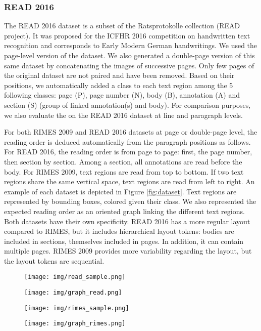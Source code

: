 \subsubsection{READ 2016}
The READ 2016 dataset is a subset of the Ratsprotokolle collection (READ project). It was proposed for the ICFHR 2016 competition on handwritten text recognition and corresponds to Early Modern German handwritings. We used the page-level version of the dataset. We also generated a double-page version of this same dataset by concatenating the images of successive pages. Only few pages of the original dataset are not paired and have been removed. Based on their positions, we automatically added a class to each text region among the 5 following classes: page (P), page number (N), body (B), annotation (A) and section (S) (group of linked annotation(s) and body). For comparison purposes, we also evaluate the \modelacc{} on the READ 2016 dataset at line and paragraph levels.


For both RIMES 2009 and READ 2016 datasets at page or double-page level, the reading order is deduced automatically from the paragraph positions as follows. 
For READ 2016, the reading order is from page to page: first, the page number, then section by section. Among a section, all annotations are read before the body.
For RIMES 2009, text regions are read from top to bottom. If two text regions share the same vertical space, text regions are read from left to right.
An example of each dataset is depicted in Figure \ref{fig:dataset}. Text regions are represented by bounding boxes, colored given their class. We also represented the expected reading order as an oriented graph linking the different text regions. Both datasets have their own specificity. READ 2016 has a more regular layout compared to RIMES, but it includes hierarchical layout tokens: bodies are included in sections, themselves included in pages. In addition, it can contain multiple pages. RIMES 2009 provides more variability regarding the layout, but the layout tokens are sequential.
\begin{figure*}[h!]
\centering
    \begin{subfigure}{0.49\textwidth}
    \centering
    \texttt{[image: img/read\_sample.png]}   
    \par\medskip
    \texttt{[image: img/graph\_read.png]}   
    \end{subfigure}
    \hfill
    \begin{subfigure}{0.49\textwidth}
    \centering
    \texttt{[image: img/rimes\_sample.png]}   
    \par\medskip 
    \texttt{[image: img/graph\_rimes.png]}  
    \end{subfigure}

    \caption{Images from READ 2016 and RIMES 2009 and associated layout graph annotation.}
\label{fig:dataset}
\end{figure*}


